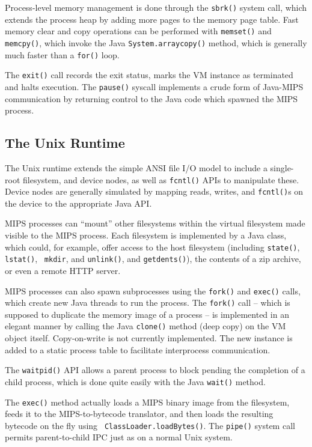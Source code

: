 \documentclass{acmconf}
\begin{document}
Process-level memory management is done through the {\tt sbrk()}
system call, which extends the process heap by adding more pages to
the memory page table.  Fast memory clear and copy operations can be
performed with {\tt memset()} and {\tt memcpy()}, which invoke the
Java {\tt System.arraycopy()} method, which is generally much faster
than a {\tt for()} loop.

The {\tt exit()} call records the exit status, marks the VM instance
as terminated and halts execution.  The {\tt pause()} syscall
implements a crude form of Java-MIPS communication by returning
control to the Java code which spawned the MIPS process.

\subsection{The Unix Runtime}

The Unix runtime extends the simple ANSI file I/O model to include a
single-root filesystem, and device nodes, as well as {\tt fcntl()}
APIs to manipulate these.  Device nodes are generally simulated by
mapping reads, writes, and {\tt fcntl()}s on the device to the
appropriate Java API.

MIPS processes can ``mount'' other filesystems within the virtual
filesystem made visible to the MIPS process.  Each filesystem is
implemented by a Java class, which could, for example, offer access to
the host filesystem (including {\tt state()}, {\tt lstat()}, {\tt
mkdir}, and {\tt unlink()}, and {\tt getdents()}), the contents of a
zip archive, or even a remote HTTP server.

MIPS processes can also spawn subprocesses using the {\tt fork()} and
{\tt exec()} calls, which create new Java threads to run the process.
The {\tt fork()} call -- which is supposed to duplicate the memory
image of a process -- is implemented in an elegant manner by calling
the Java {\tt clone()} method (deep copy) on the VM object itself.
Copy-on-write is not currently implemented.  The new instance is added
to a static process table to facilitate interprocess communication.

The {\tt waitpid()} API allows a parent process to block pending the
completion of a child process, which is done quite easily with the
Java {\tt wait()} method.

The {\tt exec()} method actually loads a MIPS binary image from the
filesystem, feeds it to the MIPS-to-bytecode translator, and then
loads the resulting bytecode on the fly using {\tt
ClassLoader.loadBytes()}.  The {\tt pipe()} system call permits
parent-to-child IPC just as on a normal Unix system.
\end{document}

